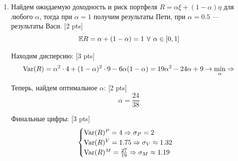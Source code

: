 \documentclass[12pt, a4paper]{article}\usepackage[]{graphicx}\usepackage[]{color}
\begin{document}
\begin{enumerate}
					[1 pt]:
					\[
					\Cov(\xi - \eta, \xi) = \Var(\xi) - \Cov(\xi, \eta) \neq 0,
					\]


					[1 pt]:
					Следовательно $\xi$ и $\eta$ зависимы.

					\item Найдем ожидаемую доходность и риск портфеля $R = \alpha \xi + (1-\alpha) \eta$ для любого $\alpha$, тогда при $\alpha = 1$ получим результаты Пети, при $\alpha = 0.5$ — результаты Васи. [2 pts]
					\[
					\mathbb{E} R = \alpha + (1-\alpha) = 1 \: \, \forall \, \: \alpha \in [0,1]
					\]

					Находим дисперсию: [3 pts]
					\[
					\operatorname{Var}(R) = \alpha^2 \cdot 4 + (1-\alpha)^2 \cdot 9 - 6\alpha (1-\alpha) = 19\alpha^2 -24\alpha + 9 \to \min_{\alpha} \Rightarrow
					\]


					Теперь, найдем оптимальное $\alpha$: [2 pts]
					\[
					\alpha = \frac{24}{38}
					\]

					Финальные цифры: [3 pts]
					\[
					\begin{cases}
					\operatorname{Var}(R)^{P} = 4 \Rightarrow \sigma_{P} = 2 \\
					\operatorname{Var}(R)^{V} = 1.75 \Rightarrow \sigma_{V} \approx 1.32 \\
					\operatorname{Var}(R)^{M} = \frac{27}{19} \Rightarrow \sigma_{M} \approx 1.19 \\
					\end{cases}
					\]





\end{enumerate}
\end{document}
